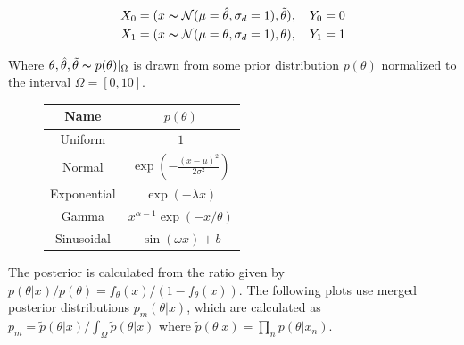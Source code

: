 \documentclass{article}
\begin{document}
\begin{align*}
X_0 = (x\thicksim \mathcal{N}(\mu=\hat\theta, \sigma_d=1), \tilde\theta), \quad Y_0 = 0 \\
X_1 = (x\thicksim \mathcal{N}(\mu=\theta, \sigma_d=1), \theta), \quad Y_1 = 1
\end{align*}

Where $\theta, \hat\theta, \tilde\theta\thicksim p(\theta)|_\Omega$ is drawn from some prior distribution $p(\theta)$ normalized to the interval $\Omega = [0, 10]$.

\begin{figure}[ht]
    \centering
    \begin{minipage}[c]{0.48\textwidth}
        \centering
        
        \label{fig:example}
    \end{minipage}\hfill
    \begin{minipage}[c]{0.48\textwidth}
        \centering
        \begin{tabular}{|c|c|}
            \hline
            \textbf{Name} & $p(\theta)$ \\ \hline
            Uniform & $1$ \\ \hline
            Normal & $\exp\left(-\frac{(x-\mu)^2}{2\sigma^2}\right)$ \\ \hline
            Exponential & $\exp(-\lambda x)$ \\ \hline
            Gamma & $x^{\alpha-1} \exp\left(-x / \theta \right)$ \\ \hline
            Sinusoidal & $\sin\left(\omega x \right)+b$ \\ \hline
        \end{tabular}
        \label{tab:4x2}
    \end{minipage}
\end{figure}

The posterior is calculated from the ratio given by $p(\theta|x)/p(\theta) = f_\theta(x)/(1-f_\theta(x))$.
The following plots use merged posterior distributions $p_m(\theta|x)$, which are calculated as $ p_m=\tilde{p}(\theta|x) / \int_\Omega \tilde{p}(\theta|x) $ where $ \tilde{p}(\theta|x) = \prod_n p(\theta|x_n) $.
\end{document}
